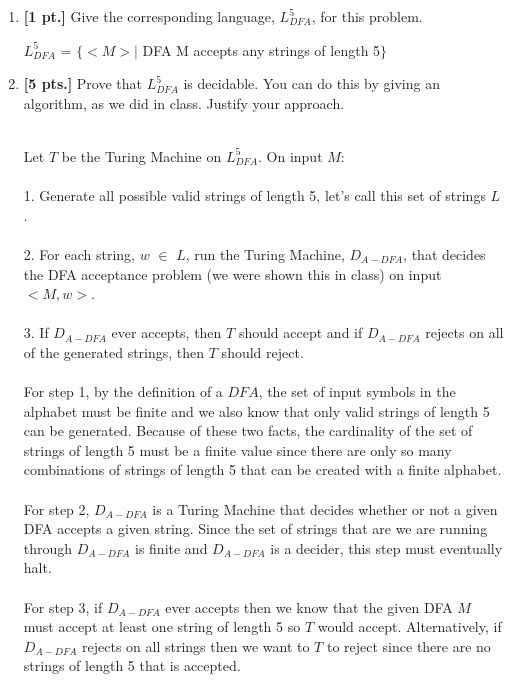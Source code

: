 \documentclass[11pt]{article}
\theoremstyle{definition}
\theoremstyle{theorem}
\newcommand{\solution}{\medskip\noindent{\color{blue}\textbf{Solution:}}}
\begin{document}
\begin{enumerate}[label=(\alph*)]

\item \textbf{[1 pt.]} Give the corresponding language, $L^5_{DFA}$, for this problem.

\solution

$L^5_{DFA}$ = $\{<M> |$ DFA M accepts any strings of length 5$\}$


\item \textbf{[5 pts.]} Prove that $L^5_{DFA}$ is decidable. You can do this by giving an algorithm, as we did in class. Justify your approach.

\solution
\\
Let $T$ be the Turing Machine on $L^5_{DFA}$. On input $M$: \\ ~ \\
1. Generate all possible valid strings of length 5, let's call this set of strings $L$. \\ ~ \\
2. For each string, $w$ $\in$ $L$, run the Turing Machine, $D_{A-DFA}$, that decides the DFA acceptance problem (we were shown this in class) on input $<M, w>$. \\ ~ \\
3. If $D_{A-DFA}$ ever accepts, then $T$ should accept and if $D_{A-DFA}$ rejects on all of the generated strings, then $T$ should reject. \\ ~ \\


For step 1, by the definition of a $DFA$, the set of input symbols in the alphabet must be finite and we also know that only valid strings of length 5 can be generated.
Because of these two facts, the cardinality of the set of strings of length 5 must be a finite value since there are only so many combinations of strings of length 5 that can be created with a finite alphabet. \\ ~ \\
For step 2, $D_{A-DFA}$ is a Turing Machine that decides whether or not a given DFA accepts a given string. Since the set of strings that are we are running through $D_{A-DFA}$ is finite and $D_{A-DFA}$ is a decider, this step must eventually halt. \\ ~ \\
For step 3, if $D_{A-DFA}$ ever accepts then we know that the given DFA $M$ must accept at least one string of length 5 so $T$ would accept. Alternatively, if $D_{A-DFA}$ rejects on all strings then we want to $T$ to reject since there are no strings of length 5 that is accepted.



\end{enumerate}
\end{document}
